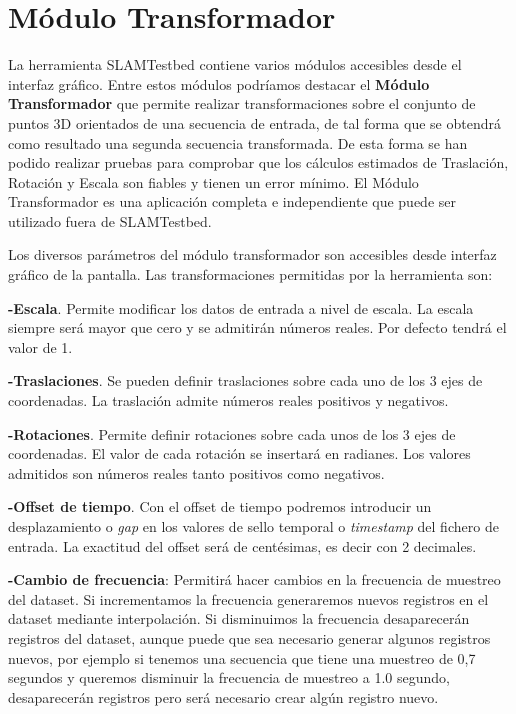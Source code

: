  
\section{Módulo Transformador}
La herramienta SLAMTestbed contiene varios módulos accesibles desde el interfaz gráfico. Entre estos módulos podríamos destacar el \textbf{Módulo Transformador} que permite
realizar transformaciones sobre el conjunto de puntos 3D orientados de una secuencia de entrada, de tal forma que se obtendrá como resultado una segunda secuencia transformada. De esta forma se han podido realizar pruebas para comprobar que los cálculos estimados de Traslación, Rotación y Escala son fiables y tienen un error mínimo.
El Módulo Transformador es una aplicación completa e independiente que  puede ser utilizado fuera de SLAMTestbed. 

Los diversos parámetros del módulo transformador son accesibles desde interfaz gráfico de la pantalla. Las transformaciones permitidas por la herramienta son:

\textbf{-Escala}. Permite modificar los datos de entrada a nivel de escala. La escala siempre será mayor que cero y se admitirán números reales. Por defecto tendrá el valor de 1. 

\textbf{-Traslaciones}. Se pueden definir traslaciones sobre cada uno de los 3 ejes de coordenadas. La traslación admite números reales positivos y negativos.

\textbf{-Rotaciones}. Permite definir rotaciones sobre cada unos de los 3 ejes de coordenadas. El valor de cada rotación se insertará en radianes. Los valores admitidos son números reales tanto positivos como negativos. 

\textbf{-Offset de tiempo}. Con el offset de tiempo podremos introducir un desplazamiento o \textit{gap} en los valores de sello temporal o \textit{timestamp} del fichero de entrada. La exactitud del offset será de centésimas, es decir con 2 decimales.

\textbf{-Cambio de frecuencia}: Permitirá hacer cambios en la frecuencia de muestreo del dataset. Si incrementamos la frecuencia generaremos nuevos registros en el dataset mediante interpolación. Si disminuimos la frecuencia desaparecerán registros del dataset, aunque puede que sea necesario generar algunos registros nuevos, por ejemplo si tenemos una secuencia que tiene una muestreo de 0,7 segundos y queremos disminuir la frecuencia de muestreo a 1.0 segundo, desaparecerán registros pero será necesario crear algún registro nuevo.

